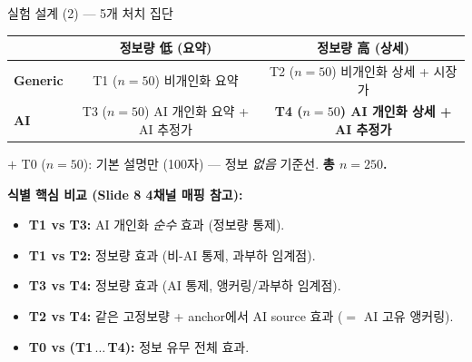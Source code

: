 \documentclass[aspectratio=169]{beamer}
\begin{document}
\begin{frame}{실험 설계 (2) --- 5개 처치 집단}
  \begin{center}
  \small
  \begin{tabular}{l|cc}
    & \textbf{정보량 低 (요약)} & \textbf{정보량 高 (상세)} \\
    \hline
    \textbf{Generic} & T1 ($n{=}50$) 비개인화 요약 & T2 ($n{=}50$) 비개인화 상세 + 시장가 \\
    \textbf{AI}      & T3 ($n{=}50$) AI 개인화 요약 + AI 추정가 & \textbf{T4 ($n{=}50$) AI 개인화 상세 + AI 추정가} \\
  \end{tabular}
  \end{center}
  \vspace{0.4em}
  $+$ T0 ($n{=}50$): 기본 설명만 (100자) --- 정보 \emph{없음} 기준선. \textbf{총 $n = 250$.}

  \vspace{0.7em}
  \textbf{식별 핵심 비교 (Slide 8 4채널 매핑 참고):}
  \begin{itemize}\itemsep0.15em
    \item \textbf{T1 vs T3:} AI 개인화 \emph{순수} 효과 (정보량 통제).
    \item \textbf{T1 vs T2:} 정보량 효과 (비-AI 통제, 과부하 임계점).
    \item \textbf{T3 vs T4:} 정보량 효과 (AI 통제, 앵커링/과부하 임계점).
    \item \textbf{T2 vs T4:} 같은 고정보량 + anchor에서 AI source 효과 ($=$ AI 고유 앵커링).
    \item \textbf{T0 vs (T1\,$\ldots$\,T4):} 정보 유무 전체 효과.
  \end{itemize}
\end{frame}
\end{document}

